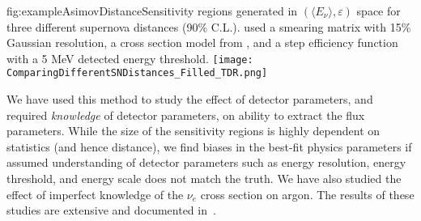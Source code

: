 \begin{dunefigure}{fig:exampleAsimovDistance}{Sensitivity regions generated
    in $(\langle E_\nu \rangle, \varepsilon)$ space
    for three different supernova distances (90\% C.L.).   used a
    smearing matrix with 15\% Gaussian resolution, a cross section
    model from , and a step efficiency function with a 5 MeV
    detected energy threshold.}
	\texttt{[image: ComparingDifferentSNDistances\_Filled\_TDR.png]}
  \end{dunefigure}


  




  We have used this method to study the effect of detector parameters,
  and required \textit{knowledge} of detector parameters, on ability
  to extract the flux parameters. While the size of the sensitivity
  regions is highly dependent on statistics (and hence distance), we
  find biases in the best-fit physics parameters
  if assumed understanding of detector parameters such as
 energy resolution, energy threshold, and energy scale does not match
 the truth.  We have
also studied the effect of imperfect knowledge of the $\nu_e$ cross
section on argon.  The results of these studies are extensive and
documented in~\cite{bib:docdb14068}.
  
